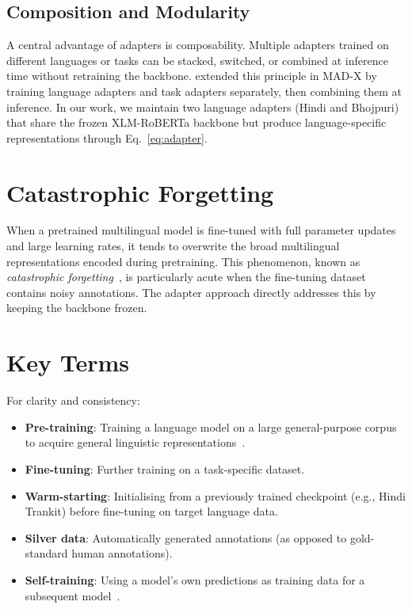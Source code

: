 \documentclass[12pt,a4paper,oneside]{report}
\newcommand{\xlmr}{XLM-RoBERTa}
\begin{document}
\subsection{Composition and Modularity}

A central advantage of adapters is composability. Multiple adapters trained on
different languages or tasks can be stacked, switched, or combined at
inference time without retraining the backbone. \citet{pfeiffer2020madx}
extended this principle in MAD-X by training language adapters and task
adapters separately, then combining them at inference. In our work, we maintain
two language adapters (Hindi and Bhojpuri) that share the frozen \xlmr{}
backbone but produce language-specific representations through Eq.~\ref{eq:adapter}.

\section{Catastrophic Forgetting}
\label{sec:forgetting}

When a pretrained multilingual model is fine-tuned with full parameter updates and
large learning rates, it tends to overwrite the broad multilingual representations
encoded during pretraining. This phenomenon, known as \emph{catastrophic
forgetting}~\citep{mccloskey1989catastrophic,kirkpatrick2017overcoming}, is
particularly acute when the fine-tuning dataset contains noisy annotations. The
adapter approach directly addresses this by keeping the backbone frozen.

\section{Key Terms}

For clarity and consistency:
\begin{itemize}
  \item \textbf{Pre-training}: Training a language model on a large general-purpose
        corpus to acquire general linguistic representations~\citep{devlin2019bert}.
  \item \textbf{Fine-tuning}: Further training on a task-specific dataset.
  \item \textbf{Warm-starting}: Initialising from a previously trained checkpoint
        (e.g., Hindi Trankit) before fine-tuning on target language data.
  \item \textbf{Silver data}: Automatically generated annotations (as opposed to
        gold-standard human annotations).
  \item \textbf{Self-training}: Using a model's own predictions as training data
        for a subsequent model~\citep{mcclosky2006selftraining}.
\end{itemize}
\end{document}
